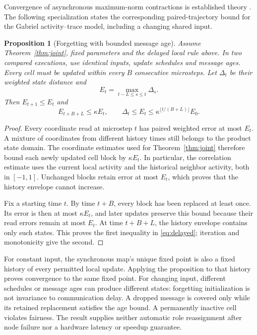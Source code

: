 \documentclass[11pt,a4paper]{article}
\newtheorem{proposition}[theorem]{Proposition}
\theoremstyle{definition}\newtheorem{definition}[theorem]{Definition}
\begin{document}
Convergence of asynchronous maximum-norm contractions is established theory \cite{bertsekas1991}. The following specialization states the corresponding paired-trajectory bound for the Gabriel activity--trace model, including a changing shared input.
\begin{proposition}[Forgetting with bounded message age]\label{prop:delayed}
Assume Theorem~\ref{thm:joint}, fixed parameters and the delayed local rule above. In two compared executions, use identical inputs, update schedules and message ages. Every cell must be updated within every $B$ consecutive microsteps. Let $\Delta_t$ be their weighted state distance and
\begin{equation}
 E_t=\max_{t-L\leq s\leq t}\Delta_s.
\end{equation}
Then $E_{t+1}\leq E_t$ and
\begin{equation}
 E_{t+B+L}\leq\kappa E_t,\qquad
 \Delta_t\leq E_t\leq\kappa^{\lfloor t/(B+L)\rfloor}E_0.
 \label{eq:delayed}
\end{equation}
\end{proposition}
\begin{proof}
Every coordinate read at microstep $t$ has paired weighted error at most $E_t$. A mixture of coordinates from different history times still belongs to the product state domain. The coordinate estimates used for Theorem~\ref{thm:joint} therefore bound each newly updated cell block by $\kappa E_t$. In particular, the correlation estimate uses the current local activity and the historical neighbor activity, both in $[-1,1]$. Unchanged blocks retain error at most $E_t$, which proves that the history envelope cannot increase.

Fix a starting time $t$. By time $t+B$, every block has been replaced at least once. Its error is then at most $\kappa E_t$, and later updates preserve this bound because their read errors remain at most $E_t$. At time $t+B+L$, the history envelope contains only such states. This proves the first inequality in \eqref{eq:delayed}; iteration and monotonicity give the second.
\end{proof}

For constant input, the synchronous map's unique fixed point is also a fixed history of every permitted local update. Applying the proposition to that history proves convergence to the same fixed point. For changing input, different schedules or message ages can produce different states: forgetting initialization is not invariance to communication delay. A dropped message is covered only while its retained replacement satisfies the age bound. A permanently inactive cell violates fairness. The result supplies neither automatic role reassignment after node failure nor a hardware latency or speedup guarantee.
\end{document}
